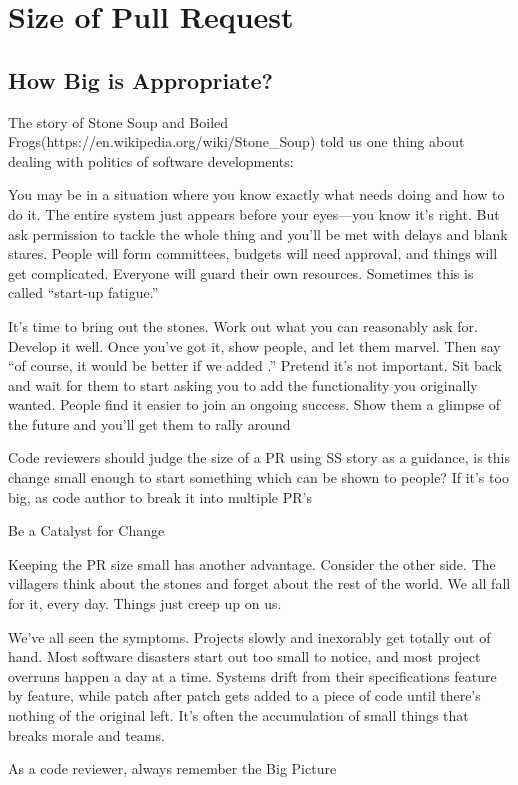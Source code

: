 
\chapter{Size of Pull Request}

\section{How Big is Appropriate?}

The story of Stone Soup and Boiled Frogs(https://en.wikipedia.org/wiki/Stone\_Soup) told us one thing about dealing with politics of software developments:

You may be in a situation where you know exactly what needs doing and how to do it. The entire system just appears before your eyes—you know it’s right. But ask permission to tackle the whole thing and you’ll be met with delays and blank stares. People will form committees, budgets will need approval, and things will get complicated. Everyone will guard their own resources. Sometimes this is called “start-up fatigue.”

It’s time to bring out the stones. Work out what you can reasonably ask for. Develop it well. Once you’ve got it, show people, and let them marvel. Then say “of course, it would be better if we added .” Pretend it’s not important. Sit back and wait for them to start asking you to add the functionality you originally wanted. People find it easier to join an ongoing success. Show them a glimpse of the future and you’ll get them to rally around

Code reviewers should judge the size of a PR using SS story as a guidance, is this change small enough to start something which can be shown to people? If it's too big, as code author to break it into multiple PR's

\begin{marker}
Be a Catalyst for Change
\end{marker}

Keeping the PR size small has another advantage. Consider the other side. The villagers think about the stones and forget about the rest of the world. We all fall for it, every day. Things just creep up on us.

We’ve all seen the symptoms. Projects slowly and inexorably get totally out of hand. Most software disasters start out too small to notice, and most project overruns happen a day at a time. Systems drift from their specifications feature by feature, while patch after patch gets added to a piece of code until there’s nothing of the original left. It’s often the accumulation of small things that breaks morale and teams.

\begin{marker}
As a code reviewer, always remember the Big Picture
\end{marker}
